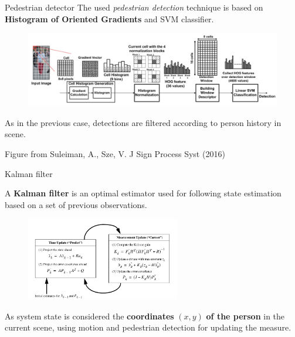 \documentclass{beamer}
\begin{document}
\begin{tframe}{Pedestrian detector}
The used \emph{pedestrian detection} technique is based on \textbf{Histogram of Oriented Gradients} and SVM classifier.

\begin{figure}[h]
\centering
\includegraphics[width=1\textwidth]{images/hog_detector.jpg}
\end{figure}

As in the previous case, detections are filtered according to person history in scene.

\vspace{0.2cm}
\hfill {\tiny Figure from Suleiman, A., Sze, V. J Sign Process Syst (2016)}
\end{tframe}


\begin{tframe}{Kalman filter}

A \textbf{Kalman filter} is an optimal estimator used for following state estimation based on a set of previous observations.
\begin{figure}[h]
\centering
\includegraphics[width=0.6\textwidth]{images/kalmaneq.jpg}
\end{figure}
As system state is considered the \textbf{coordinates} $(x, y)$ \textbf{of the person} in the current scene, using motion and pedestrian detection for updating the measure.
\end{tframe}
\end{document}
